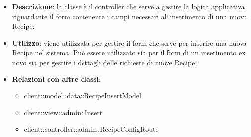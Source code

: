 			\begin{itemize}
				\item \textbf{Descrizione}: la classe è il controller che serve a gestire la logica applicativa riguardante il form contenente i campi necessari all'inserimento di una nuova Recipe;
				\item \textbf{Utilizzo}: viene utilizzata per gestire il form che serve per inserire una nuova Recipe nel sistema. Può essere utilizzato sia per il form di un inserimento ex novo sia per gestire i dettagli delle richieste di nuove Recipe;
				\item \textbf{Relazioni con altre classi}:
					\begin{itemize}
						\item client::model::data::RecipeInsertModel
						\item client::view::admin::Insert
						\item client::controller::admin::RecipeConfigRoute
					\end{itemize}


\end{itemize}
